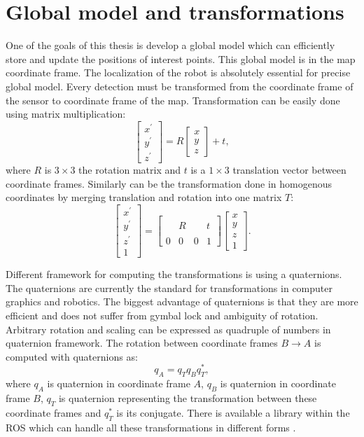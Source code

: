 \section{Global model and transformations}
One of the goals of this thesis is develop a global model which can efficiently store and update the positions of interest points. This global model is in the map coordinate frame. The localization of the robot is absolutely essential for precise global model. Every detection must be transformed from the coordinate frame of the sensor to coordinate frame of the map. Transformation can be easily done using matrix multiplication:
\begin{equation}
\begin{bmatrix}
x^\prime \\
y^\prime \\
z^\prime 
\end{bmatrix}
=
R \begin{bmatrix}
x \\
y \\
z
\end{bmatrix}
+ t,
\end{equation}
where $R$ is $3\times3$ the rotation matrix and $t$ is a $1\times3$ translation vector between coordinate frames. Similarly can be the transformation done in homogenous coordinates by merging translation and rotation into one matrix $T$:
\begin{equation}
\begin{bmatrix}
x^\prime \\
y^\prime \\
z^\prime \\
1
\end{bmatrix}
=
\begin{bmatrix}
 & & & \\
 & R & & t \\
 & & & \\
 0 & 0 & 0 & 1
\end{bmatrix}
\begin{bmatrix}
x \\
y \\
z \\
1
\end{bmatrix}.
\end{equation}

Different framework for computing the transformations is using a quaternions. The quaternions are currently the standard for transformations in computer graphics and robotics. The biggest advantage of quaternions is that they are more efficient and does not suffer from gymbal lock and ambiguity of rotation. Arbitrary rotation and scaling can be expressed as quadruple of numbers in quaternion framework. The rotation between coordinate frames $B \to A$ is computed with quaternions as:
\begin{equation}
q_A = q_T q_B q_T^*,
\end{equation}
where $q_A$ is quaternion in coordinate frame $A$, $q_B$ is quaternion in coordinate frame $B$, $q_T$ is quaternion representing the transformation between these coordinate frames and $q_T^*$ is its conjugate. There is available a library within the ROS which can handle all these transformations in different forms \cite{tf}. 


